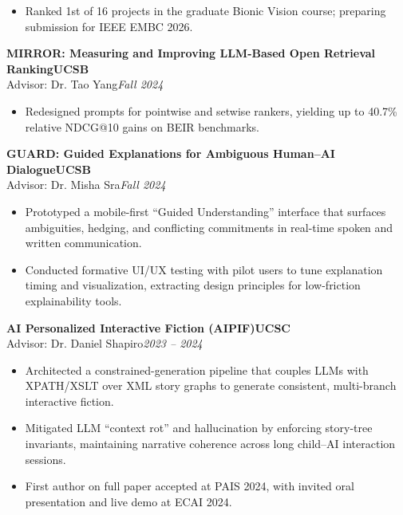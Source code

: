 \documentclass[11pt]{article}
\newcommand{\CVEntry}[4]{%
  \vspace{0.4em} %
  {\bfseries #1}\hfill {\bfseries #2}\\[0.1em] 
  #3\hfill \textit{#4}
}
\begin{document}
{\begin{itemize}
    \item Ranked 1st of 16 projects in the graduate Bionic Vision course; preparing submission for IEEE EMBC 2026.
  \end{itemize}
  \vspace{0.4em}
  \CVEntry
    {MIRROR: Measuring and Improving LLM-Based Open Retrieval Ranking}
    {UCSB}
    {Advisor: Dr. Tao Yang}
    {Fall 2024}
  \begin{itemize}
    \item Redesigned prompts for pointwise and setwise rankers, yielding up to 40.7\% relative NDCG@10 gains on BEIR benchmarks.
  \end{itemize}
  \vspace{0.4em}
  \CVEntry
    {GUARD: Guided Explanations for Ambiguous Human–AI Dialogue}
    {UCSB}
    {Advisor: Dr. Misha Sra}
    {Fall 2024}
  \begin{itemize}
    \item Prototyped a mobile-first ``Guided Understanding'' interface that surfaces ambiguities, hedging, and conflicting commitments in real-time spoken and written communication.
    \item Conducted formative UI/UX testing with pilot users to tune explanation timing and visualization, extracting design principles for low-friction explainability tools.
  \end{itemize}
  \vspace{0.4em}
  \CVEntry
    {AI Personalized Interactive Fiction (AIPIF)}
    {UCSC}
    {Advisor: Dr. Daniel Shapiro}
    {2023 -- 2024}
  \begin{itemize}
    \item Architected a constrained-generation pipeline that couples LLMs with XPATH/XSLT over XML story graphs to generate consistent, multi-branch interactive fiction.
    \item Mitigated LLM ``context rot'' and hallucination by enforcing story-tree invariants, maintaining narrative coherence across long child--AI interaction sessions.
    \item First author on full paper accepted at PAIS 2024, with invited oral presentation and live demo at ECAI 2024.

\end{itemize}}
\end{document}
